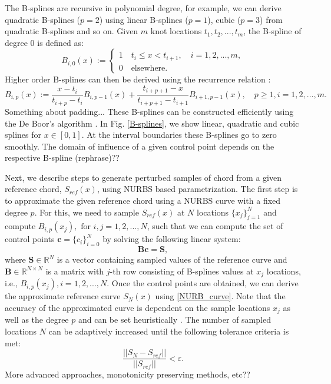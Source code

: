 \documentclass[review]{elsarticle}
\newtheorem{remark}{Remark}[section]
\numberwithin{equation}{section}
\numberwithin{equation}{section}
\begin{document}
The B-splines are recursive in polynomial degree, for example, we can derive quadratic B-splines ($p=2$) using linear B-splines ($p=1$), cubic ($p=3$) from quadratic B-splines and so on. Given $m$ knot locations $t_1, t_2, ..., t_{m}$, the B-spline of degree 0 is defined as:
\begin{equation}\label{linearBspline}
B_{i,0}(x) :=
\begin{cases}
1\quad t_i\leq x < t_{i+1},\quad i = 1,2,...,m,\\
0\quad\text{elsewhere.}
\end{cases} 
\end{equation}
Higher order B-splines can then be derived using the recurrence relation \cite{deBoor}:
\begin{equation}\label{NURBS_recurrence}
B_{i,p}(x) := \frac{x-t_i}{t_{i+p} - t_i}B_{i,p-1}(x) + \frac{t_{i+p+1}  -  x}{t_{i+p+1}  -  t_{i+1}}B_{i+1,p-1}(x),\quad p\geq1, i = 1,2,...,m.
\end{equation} 
Something about padding...
These B-splines can be constructed efficiently using the De Boor's algorithm \cite{deBoor}. In Fig. \ref{B-splines}, we show linear, quadratic and cubic splines for $x\in[0,1]$. At the interval boundaries these B-splines go to zero smoothly. The domain of influence of a given control point depends on the respective B-spline (rephrase)??

Next, we describe steps to generate perturbed samples of chord from a given reference chord, $S_{ref}(x)$, using NURBS based parametrization. The first step is to approximate the given reference chord using a NURBS curve with a fixed degree $p$. For this, we need to sample $S_{ref}(x)$ at $N$ locations $\{x_j\}_{j=1}^N$ and compute $B_{i,p}(x_j), \text{ for }i, j = 1,2, ..., N$, such that we can compute the set of control points $\mathbf{c}=\{c_i\}_{i=0}^N$ by solving the following linear system:
\begin{equation}\label{nurbs_inversion}
\mathbf{B}\mathbf{c} = \mathbf{S},
\end{equation}
where $\mathbf{S}\in \mathbb{R}^{N}$ is a vector containing sampled values of the reference curve and $\mathbf{B}\in \mathbb{R}^{N\times N}$ is a matrix with $j$-th row consisting of B-splines values at $x_j$ locations, i.e., $B_{i,p}(x_j), i= 1, 2,..., N$. 
Once the control points are obtained, we can derive the approximate reference curve $S_N(x)$ using \eqref{NURB_curve}. Note that the accuracy of the approximated curve is dependent on the sample locations $x_j$ as well as the degree $p$ and can be set heuristically \cite{adaptiveNurbs}. The number of sampled locations $N$ can be adaptively increased until the following tolerance criteria is met:
\begin{equation}
\frac{||S_N - S_{ref}||}{||S_{ref}||} <\varepsilon.
\end{equation}
More advanced approaches, monotonicity preserving methods, etc??
%
\end{document}
